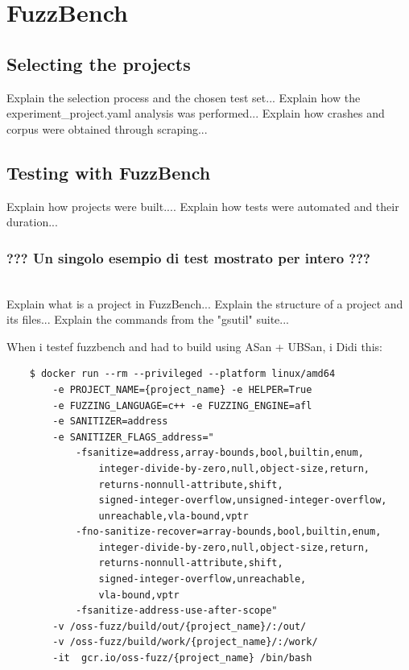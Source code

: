 \newpage
\section{FuzzBench}
\subsection{Selecting the projects}
Explain the selection process and the chosen test set...
\newline \newline
Explain how the experiment\_project.yaml analysis was performed...
\newline \newline
Explain how crashes and corpus were obtained through scraping...
\newline \newline
\subsection{Testing with FuzzBench}
Explain how projects were built....
\newline \newline
Explain how tests were automated and their duration...
\subsubsection{??? Un singolo esempio di test mostrato per intero ???}

\ \\ \newline \newline \newline
Explain what is a project in FuzzBench...
\newline \newline
Explain the structure of a project and its files...
\newline \newline
Explain the commands from the "gsutil" suite...


\newpage
When i testef fuzzbench and had to build using ASan + UBSan, i Didi this:
\begin{verbatim}
    $ docker run --rm --privileged --platform linux/amd64 
        -e PROJECT_NAME={project_name} -e HELPER=True 
        -e FUZZING_LANGUAGE=c++ -e FUZZING_ENGINE=afl 
        -e SANITIZER=address 
        -e SANITIZER_FLAGS_address="
            -fsanitize=address,array-bounds,bool,builtin,enum,
                integer-divide-by-zero,null,object-size,return,
                returns-nonnull-attribute,shift,
                signed-integer-overflow,unsigned-integer-overflow,
                unreachable,vla-bound,vptr
            -fno-sanitize-recover=array-bounds,bool,builtin,enum,
                integer-divide-by-zero,null,object-size,return,
                returns-nonnull-attribute,shift,
                signed-integer-overflow,unreachable,
                vla-bound,vptr 
            -fsanitize-address-use-after-scope" 
        -v /oss-fuzz/build/out/{project_name}/:/out/  
        -v /oss-fuzz/build/work/{project_name}/:/work/
        -it  gcr.io/oss-fuzz/{project_name} /bin/bash
\end{verbatim}

